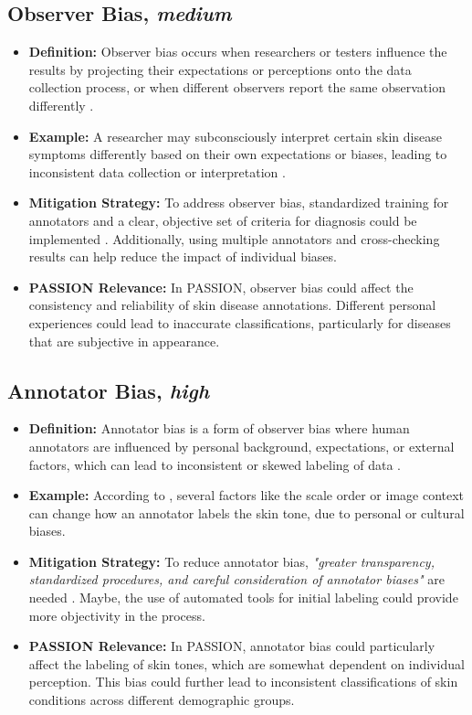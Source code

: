\documentclass[12pt, a4paper, oneside]{book}   	%
\begin{document}
\begin{appendices}
		\subsection{Observer Bias, \textit{medium}}
		\begin{itemize}
			\item \textbf{Definition:} Observer bias occurs when researchers or testers influence the results by projecting their expectations or perceptions onto the data collection process, or when different observers report the same observation differently \autocite{Mester_2022, Chakraborty_2024, c29, c26}.
			\item \textbf{Example:} A researcher may subconsciously interpret certain skin disease symptoms differently based on their own expectations or biases, leading to inconsistent data collection or interpretation \autocite{Chakraborty_2024}.
			\item \textbf{Mitigation Strategy:} To address observer bias, standardized training for annotators and a clear, objective set of criteria for diagnosis could be implemented \autocite{Montoya_2025}. Additionally, using multiple annotators and cross-checking results can help reduce the impact of individual biases.
			\item \textbf{PASSION Relevance:} In PASSION, observer bias could affect the consistency and reliability of skin disease annotations. Different personal experiences could lead to inaccurate classifications, particularly for diseases that are subjective in appearance.
		\end{itemize}
		
		\subsection{Annotator Bias, \textit{high}}
		\begin{itemize}
			\item \textbf{Definition:} Annotator bias is a form of observer bias where human annotators are influenced by personal background, expectations, or external factors, which can lead to inconsistent or skewed labeling of data \autocite{Montoya_2025}.
			\item \textbf{Example:} According to \textcite{Montoya_2025}, several factors like the scale order or image context can change how an annotator labels the skin tone, due to personal or cultural biases.
			\item \textbf{Mitigation Strategy:} To reduce annotator bias, \textit{"greater transparency, standardized procedures, and careful consideration of annotator biases"} are needed \autocite{Montoya_2025}. Maybe, the use of automated tools for initial labeling could provide more objectivity in the process.
			\item \textbf{PASSION Relevance:} In PASSION, annotator bias could particularly affect the labeling of skin tones, which are somewhat dependent on individual perception. This bias could further lead to inconsistent classifications of skin conditions across different demographic groups.
		\end{itemize}
		

\end{appendices}
\end{document}
